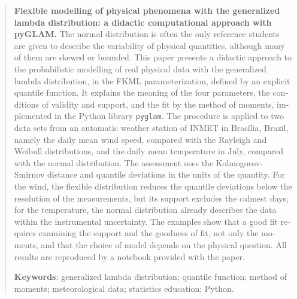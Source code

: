 \begin{otherlanguage}{english}
\begin{abstract}
\noindent\textbf{Flexible modelling of physical phenomena with the generalized lambda distribution: a didactic computational approach with pyGLAM.}
The normal distribution is often the only reference students are given to describe the variability of physical quantities, although many of them are skewed or bounded. This paper presents a didactic approach to the probabilistic modelling of real physical data with the generalized lambda distribution, in the FKML parameterization, defined by an explicit quantile function. It explains the meaning of the four parameters, the conditions of validity and support, and the fit by the method of moments, implemented in the Python library \texttt{pyglam}. The procedure is applied to two data sets from an automatic weather station of INMET in Brasília, Brazil, namely the daily mean wind speed, compared with the Rayleigh and Weibull distributions, and the daily mean temperature in July, compared with the normal distribution. The assessment uses the Kolmogorov-Smirnov distance and quantile deviations in the units of the quantity. For the wind, the flexible distribution reduces the quantile deviations below the resolution of the measurements, but its support excludes the calmest days; for the temperature, the normal distribution already describes the data within the instrumental uncertainty. The examples show that a good fit requires examining the support and the goodness of fit, not only the moments, and that the choice of model depends on the physical question. All results are reproduced by a notebook provided with the paper.

\medskip
\noindent\textbf{Keywords}: generalized lambda distribution; quantile function; method of moments; meteorological data; statistics education; Python.
\end{abstract}
\end{otherlanguage}
